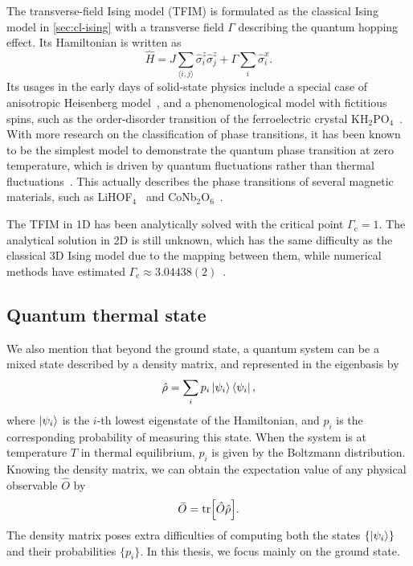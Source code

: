 The transverse-field Ising model (TFIM) is formulated as the classical Ising model in \cref{sec:cl-ising} with a transverse field $\Gamma$ describing the quantum hopping effect. Its Hamiltonian is written as
\begin{equation}
\hat{H} = J \sum_{\langle i, j \rangle} \hat{\sigma}^z_i \hat{\sigma}^z_j
+ \Gamma \sum_i \hat{\sigma}^x_i.
\label{eq:qu-ising}
\end{equation}
Its usages in the early days of solid-state physics include a special case of anisotropic Heisenberg model~\cite{katsura1962statistical}, and a phenomenological model with fictitious spins, such as the order-disorder transition of the ferroelectric crystal KH$_2$PO$_4$~\cite{de1963collective}. With more research on the classification of phase transitions, it has been known to be the simplest model to demonstrate the quantum phase transition at zero temperature, which is driven by quantum fluctuations rather than thermal fluctuations~\cite{sachdev2001quantum, suzuki2012quantum}. This actually describes the phase transitions of several magnetic materials, such as LiHOF$_4$~\cite{bitko1996quantum} and CoNb$_2$O$_6$~\cite{coldea2010quantum}.

The TFIM in 1D has been analytically solved with the critical point $\Gamma_\text{c} = 1$. The analytical solution in 2D is still unknown, which has the same difficulty as the classical 3D Ising model due to the mapping between them, while numerical methods have estimated $\Gamma_\text{c} \approx 3.04438(2)$~\cite{blote2002cluster}.

\subsection{Quantum thermal state}

We also mention that beyond the ground state, a quantum system can be a mixed state described by a density matrix, and represented in the eigenbasis by
\begin{equation}
\hat{\rho} = \sum_i p_i \ket{\psi_i}\bra{\psi_i},
\end{equation}
where $\ket{\psi_i}$ is the $i$-th lowest eigenstate of the Hamiltonian, and $p_i$ is the corresponding probability of measuring this state. When the system is at temperature $T$ in thermal equilibrium, $p_i$ is given by the Boltzmann distribution. Knowing the density matrix, we can obtain the expectation value of any physical observable $\hat{O}$ by
\begin{equation}
\bar{O} = \tr[\hat{O} \hat{\rho}].
\label{eq:dm-obs}
\end{equation}
The density matrix poses extra difficulties of computing both the states $\left\{ \ket{\psi_i} \right\}$ and their probabilities $\{p_i\}$. In this thesis, we focus mainly on the ground state.
